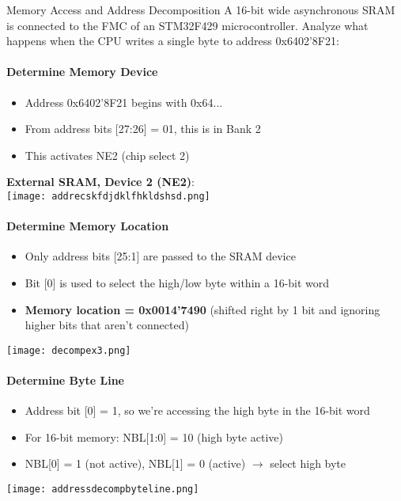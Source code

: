 \begin{example2}{Memory Access and Address Decomposition} 
    A 16-bit wide asynchronous SRAM is connected to the FMC of an STM32F429 microcontroller. Analyze what happens when the CPU writes a single byte to address 0x6402'8F21:
    \paragraph{Determine Memory Device}
    \begin{itemize}
     \item Address 0x6402'8F21 begins with 0x64...
     \item From address bits [27:26] = 01, this is in Bank 2
     \item This activates NE2 (chip select 2)
   \end{itemize}
    \textbf{External SRAM, Device 2 (NE2)}:\\
    \texttt{[image: addrecskfdjdklfhkldshsd.png]}

    \paragraph{Determine Memory Location}
       \begin{itemize}
     \item Only address bits [25:1] are passed to the SRAM device
     \item Bit [0] is used to select the high/low byte within a 16-bit word
     \item \textbf{Memory location = 0x0014'7490} (shifted right by 1 bit and ignoring higher bits that aren't connected)
   \end{itemize}
    \texttt{[image: decompex3.png]}

    \paragraph{Determine Byte Line}
       \begin{itemize}
     \item Address bit [0] = 1, so we're accessing the high byte in the 16-bit word
     \item For 16-bit memory: NBL[1:0] = 10 (high byte active)
     \item NBL[0] = 1 (not active), NBL[1] = 0 (active) $\rightarrow$ select high byte
   \end{itemize}
    \texttt{[image: addressdecompbyteline.png]}
\end{example2}

